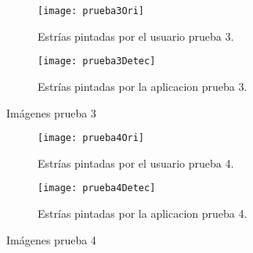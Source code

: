 \begin{figure}
	\begin{subfigure}[c]{.5\linewidth}
	\centering\large \texttt{[image: prueba3Ori]}
	\caption{Estrías pintadas por el usuario prueba 3.}\label{fig:orip3}
	\end{subfigure}%
	\begin{subfigure}[c]{.5\linewidth}
	\centering\large \texttt{[image: prueba3Detec]}
	\caption{Estrías pintadas por la aplicacion prueba 3.}\label{fig:calcp3}
	\end{subfigure}%
	\caption{Imágenes prueba 3}
	\label{fig:p3}

\end{figure}



\begin{figure}
	\begin{subfigure}[c]{.5\linewidth}
	\centering\large \texttt{[image: prueba4Ori]}
	\caption{Estrías pintadas por el usuario prueba 4.}\label{fig:orip4} 
	\end{subfigure}%
	\begin{subfigure}[c]{.5\linewidth}
	\centering\large \texttt{[image: prueba4Detec]}
	\caption{Estrías pintadas por la aplicacion prueba 4.}\label{fig:calcp4}
	\end{subfigure}%
	\caption{Imágenes prueba 4}
	\label{fig:p4}

\end{figure}
